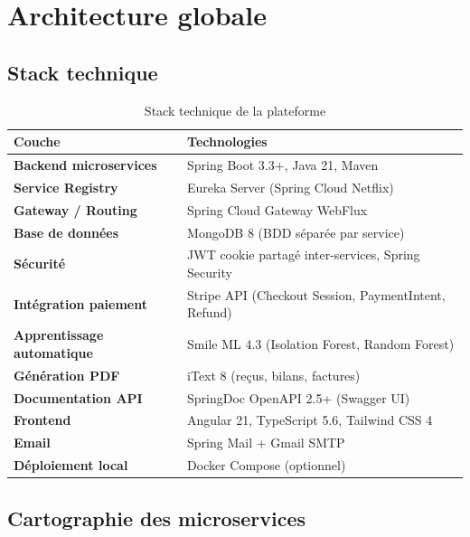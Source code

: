 \documentclass[11pt,a4paper]{article}
\begin{document}
\section{Architecture globale}

\subsection{Stack technique}

\begin{table}[h]
  \centering
  \small
  \begin{tabularx}{\linewidth}{>{\bfseries}lX}
    \toprule
    Couche & Technologies \\
    \midrule
    Backend microservices  & Spring Boot 3.3+, Java 21, Maven \\
    Service Registry        & Eureka Server (Spring Cloud Netflix) \\
    Gateway / Routing       & Spring Cloud Gateway WebFlux \\
    Base de données        & MongoDB 8 (BDD séparée par service) \\
    Sécurité               & JWT cookie partagé inter-services, Spring Security \\
    Intégration paiement    & Stripe API (Checkout Session, PaymentIntent, Refund) \\
    Apprentissage automatique & Smile ML 4.3 (Isolation Forest, Random Forest) \\
    Génération PDF          & iText 8 (reçus, bilans, factures) \\
    Documentation API       & SpringDoc OpenAPI 2.5+ (Swagger UI) \\
    Frontend                & Angular 21, TypeScript 5.6, Tailwind CSS 4 \\
    Email                   & Spring Mail + Gmail SMTP \\
    Déploiement local       & Docker Compose (optionnel) \\
    \bottomrule
  \end{tabularx}
  \caption{Stack technique de la plateforme}
\end{table}

\subsection{Cartographie des microservices}
\end{document}
